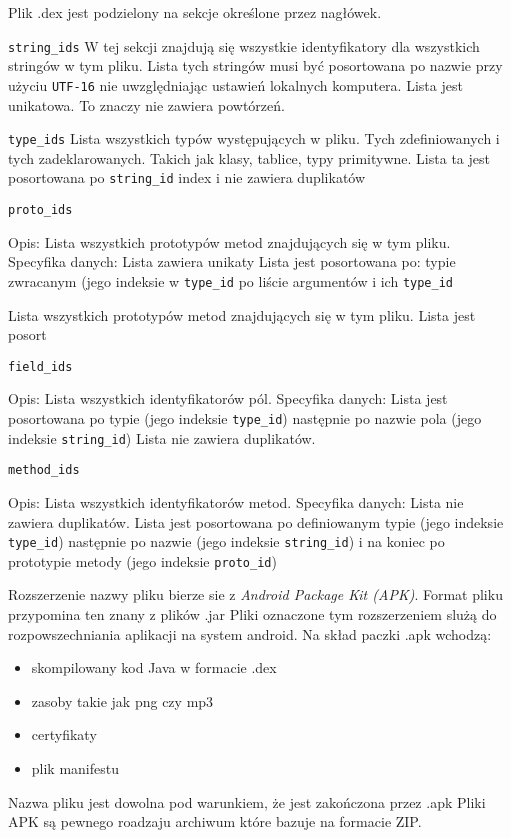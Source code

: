 \documentclass[12pt,a4paper,leqno,oneside,titlepage]{book}
\begin{document}
Plik .dex jest podzielony na sekcje określone przez nagłówek.

\verb|string_ids|  W tej sekcji znajdują się wszystkie identyfikatory dla wszystkich stringów w tym pliku. Lista tych stringów musi być posortowana po nazwie przy użyciu \verb|UTF-16| nie uwzględniając ustawień lokalnych komputera. Lista jest unikatowa. To znaczy nie zawiera powtórzeń.

\verb|type_ids| Lista wszystkich typów występujących w pliku. Tych zdefiniowanych i tych zadeklarowanych. Takich jak klasy, tablice, typy primitywne. Lista ta jest posortowana po \verb|string_id| index i nie zawiera duplikatów

\verb|proto_ids|	

Opis:
	Lista wszystkich prototypów metod znajdujących się w tym pliku.
Specyfika danych:
	Lista zawiera unikaty
	Lista jest posortowana po:
		typie zwracanym (jego indeksie w \verb|type_id|
		po liście argumentów i ich \verb|type_id|

Lista wszystkich prototypów metod znajdujących się w tym pliku. Lista jest posort 


\verb|field_ids|

Opis:
	Lista wszystkich identyfikatorów pól.	
Specyfika danych:
	Lista jest posortowana po typie (jego indeksie \verb|type_id|) następnie po nazwie pola (jego indeksie \verb|string_id|)
	Lista nie zawiera duplikatów.
	
\verb|method_ids|

Opis:
	Lista wszystkich identyfikatorów metod.
Specyfika danych:
	Lista nie zawiera duplikatów.
	Lista jest posortowana po definiowanym typie (jego indeksie \verb|type_id|)
	następnie po nazwie (jego indeksie \verb|string_id|) i na koniec po prototypie metody (jego indeksie \verb|proto_id|)


Rozszerzenie nazwy pliku bierze sie z \emph{Android Package Kit (APK)}.
Format pliku przypomina ten znany z plików .jar
Pliki oznaczone tym rozszerzeniem slużą do rozpowszechniania aplikacji na system android. Na skład paczki .apk wchodzą:

\begin{itemize}
\item skompilowany kod Java w formacie .dex
\item zasoby takie jak png czy mp3
\item certyfikaty
\item plik manifestu
\end{itemize}

Nazwa pliku jest dowolna pod warunkiem, że jest zakończona przez .apk
Pliki APK są pewnego roadzaju archiwum które bazuje na formacie ZIP.
\end{document}
